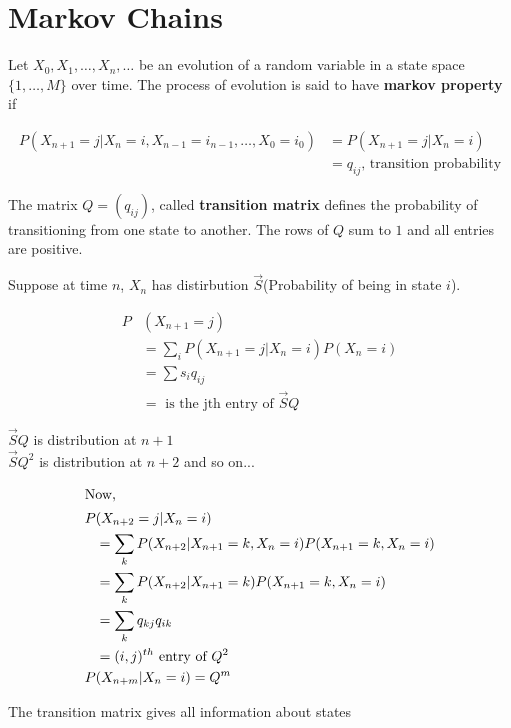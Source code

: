 \section{Markov Chains}
\parindent=0pt
\begin{slide}

\noindent{}Let $X_0, X_1, \ldots, X_n, \ldots $ be an evolution of a random variable in a state space $\{1,\ldots ,M\}$ over time.
The process of evolution is said to have \textbf{markov property} if
\begin{shaded}
\begin{align*}
P(X_{n+1} =j|X_n=i,X_{n-1} = i_{n-1},\ldots, X_0 = i_0)
&= P(X_{n+1} = j| X_n=i) 
\\
&=q_{ij} \text{, transition probability}
\end{align*}
\end{shaded}

The matrix $Q = (q_{ij})$, called \textbf{transition matrix} defines the probability of transitioning from one state to another. The rows of $Q$ sum to $1$ and all entries are positive.
\end{slide}

\setlength{\columnseprule}{1pt}
\begin{slidemaximus}
\begin{multicols}{2}
Suppose at time $n$,  $X_n$ has distirbution $\vec{S}$(Probability of being in state $i$). 

\begin{align*}
P&(X_{n+1} = j) 
\\
&= \sum _{i} P(X_{n+1} = j| X_n=i)P(X_n = i)
\\
&= \sum s_iq_{ij} 
\\
&=\text{ is the jth entry of }\vec{S}Q
\end{align*}

$\vec{S}Q$ is distribution at $n+1$\\
$\vec{S}Q^2$ is distribution at $n+2$ and so on...

\begin{align*}
\intertext{Now,} 
P&(X_{n+2}=j|X_n=i) 
\\
&= \sum_k P(X_{n+2}|X_{n+1}=k,X_n=i)P(X_{n+1}=k,X_n=i)
\\
&= \sum_k P(X_{n+2}|X_{n+1}=k)P(X_{n+1}=k,X_n=i)
\\
&= \sum_k q_{kj}q_{ik}
\\
&= (i,j)^{th} \text{ entry of } Q^2
\\
P&(X_{n+m}|X_n=i) = Q^m
\end{align*}
\end{multicols}
\centering
The transition matrix gives all information about states
\end{slidemaximus}

